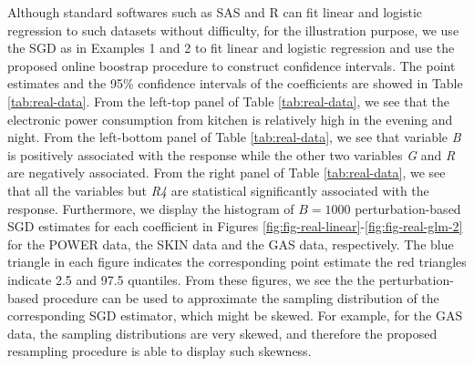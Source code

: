 \documentclass[twoside,11pt]{article}
\begin{document}
Although standard softwares such as SAS and R can fit linear and logistic regression to such datasets without difficulty, for the illustration purpose, we use the SGD as in Examples 1 and 2 to fit linear and logistic regression and use the proposed online boostrap procedure to construct confidence intervals. The point estimates and the 95\% confidence intervals of the coefficients are showed in Table \ref{tab:real-data}. From the left-top panel of Table \ref{tab:real-data}, we see that the electronic power consumption from kitchen is relatively high in the evening and night. From the left-bottom panel of Table \ref{tab:real-data}, we see that variable {\it B} is positively associated with the response while the other two variables {\it G} and {\it R} are negatively associated. From the right panel of Table \ref{tab:real-data}, we see that all the variables but {\it R4} are statistical significantly associated with the response. Furthermore, we display the histogram of $B=1000$ perturbation-based SGD estimates for each coefficient in Figures \ref{fig:fig-real-linear}-\ref{fig:fig-real-glm-2} for the POWER data, the SKIN data and the GAS data, respectively. The blue triangle in each figure indicates the corresponding point estimate the red triangles indicate 2.5 and 97.5 quantiles. From these figures, we see the the perturbation-based procedure can be used to approximate the sampling distribution of the corresponding SGD estimator, which might be skewed. For example, for the GAS data, the sampling distributions are very skewed, and therefore the proposed resampling procedure is able to display such skewness.
\end{document}
